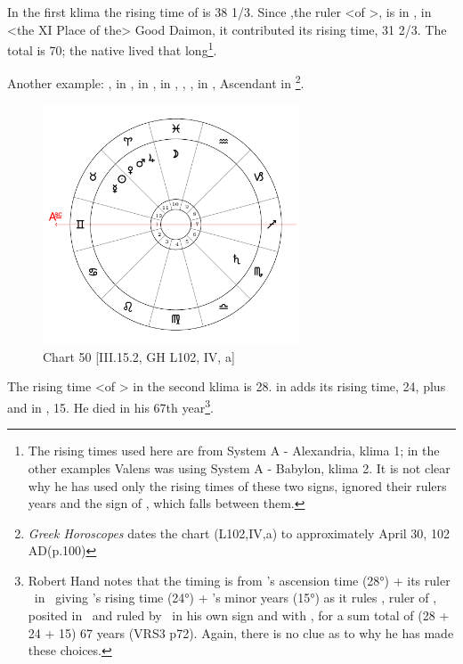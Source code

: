 In the first klima the rising time of \Virgo\xspace is 38 1/3. Since \Mercury,the ruler <of \Virgo>, is in \Cancer, in <the XI Place of the> Good Daimon, it contributed its rising time, 31 2/3. The total is 70; the native lived that long\footnote{The rising times used here are from System A - Alexandria, klima 1; in the other examples Valens was using System A - Babylon, klima 2. It is not clear why he has used only the rising times of these two signs, ignored their rulers years and the sign of \Leo, which falls between them.}.

\newpage
Another example: \Sun, \Mercury\xspace in \Taurus, \Moon\xspace in \Pisces, \Saturn\xspace in \Scorpio, \Jupiter, \Mars, \Venus in \Aries, Ascendant in \Gemini
\footnote{\textit{Greek Horoscopes} dates the chart (L102,IV,a) to approximately April 30, 102 AD(p.100)}.

\clearpage
\begin{figure}
\centering
\vspace{-20pt}
\includegraphics[width=0.68\textwidth]{charts/3_15_2}
\caption{Chart 50 [III.15.2, GH L102, IV, a]}
\label{fig:chart50}
\end{figure} 

The rising time <of \Gemini> in the second klima is 28. \Mercury\xspace in \Taurus\xspace adds its rising time, 24, plus \Mars\xspace and \Venus\xspace in \Aries, 15. He died in his 67th year\footnote{Robert Hand notes that the timing is from \Gemini's ascension time (28°) + its ruler \Mercury\, in \Taurus\, giving \Taurus's rising time (24°) + \Mars's minor years (15°) as it rules \Venus, ruler of \Taurus, posited in \Aries\, and ruled by \Mars\, in his own sign and with \Venus, for a sum total of (28 + 24 + 15) 67 years (VRS3 p72). Again, there is no clue as to why he has made these choices. }.

